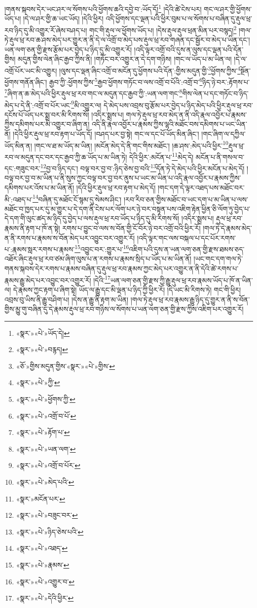 །གནས་སྐབས་དེར་ཡང་ཤར་ལ་སོགས་པའི་ཕྱོགས་ཆའི་དབྱེ་བ་:ཡོད་དོ།\footnote{«སྣར་»«པེ་»ཡོད་དེ།} །དེའི་ཚེ་ངེས་པར། གང་ལ་ཤར་གྱི་ཕྱོགས་ཡོད་པ། །དེ་ལ་ཤར་གྱི་ཆ་ཡང་ཡོད། །དེའི་ཕྱིར། འདི་ཕྱོགས་དང་ལྡན་པའི་ཕྱིར་བུམ་པ་ལ་སོགས་པ་བཞིན་དུ་རྡུལ་ཕྲ་རབ་ཉིད་དུ་མི་འགྱུར་རོ་ཞེས་བཤད་པ། གང་གི་རྡུལ་ལ་ཕྱོགས་ཡོད་པ། །དེས་རྡུལ་རྡུལ་ཕྲན་མིན་པར་བསྙད།\footnote{«སྣར་»«པེ་»བརྙད།} །གལ་ཏེ་རྡུལ་ཕྲ་རབ་ཆ་ཤས་མེད་པར་གྱུར་ན་ནི་དེ་ལ་འགྲོ་བ་མེད་པས་རྡུལ་ཕྲ་རབ་གཞན་དང་སྦྱོར་བ་མེད་པ་ཡིན་དང་། ཡན་ལག་ཅན་གྱི་རྫས་རྩོམ་པར་བྱེད་པ་ཉིད་དུ་མི་འགྱུར་རོ། །འདི་ལྟར་འགྲོ་བའི་དུས་ན་ལུས་དང་ལྡན་པའི་དོན་གྱིས། མདུན་གྱིས་ལེན་ཞིང་རྒྱབ་ཀྱིས་ནི། །གཏོང་བར་འགྱུར་ན་དེ་དག་གཉིས། །གང་ལ་ཡོད་པ་མ་ཡིན་ལ། །དེ་ལ་འགྲོ་པོར་ཡང་མི་འགྱུར། །ལུས་དང་ལྡན་ཞིང་འགྲོ་བ་མངོན་དུ་ཕྱོགས་པའི་དོན་:གྱིས་མདུན་གྱི་\footnote{«ཅོ་»གྱིས་མདུན་གྱིས་«སྣར་»«པེ་»གྱིས་}ཕྱོགས་ཀྱིས་\footnote{«སྣར་»«པེ་»ཀྱི་}སྔོན་ཕྱོགས་གནོན་ཞིང་། རྒྱབ་ཀྱི་:ཕྱོགས་ཀྱིས་\footnote{«སྣར་»«པེ་»ཕྱོགས་ཀྱི་}རྒྱབ་ཕྱོགས་གཏོང་བ་ལས་འགྲོ་བ་པོའི་:འགྲོ་བ་\footnote{«སྣར་»«པེ་»འགྲོ་བ་པོ་}ཉིད་ཉེ་བར་:རྟོགས་པ་\footnote{«སྣར་»«པེ་»རྟོག་པ་}ཞིག་ན་ཆ་མེད་པའི་ཕྱིར་རྡུལ་ཕྲ་རབ་གང་ལ་མདུན་དང་རྒྱབ་ཀྱི་:ཡན་ལག་གང་\footnote{«སྣར་»«པེ་»ཡན་ལག་}གིས་ལེན་པ་དང་གཏོང་བ་ཉིད་མེད་པ་དེ་ནི་:འགྲོ་བ་པོར་ཡང་\footnote{«སྣར་»«པེ་»འགྲོ་བ་པོར་}མི་འགྱུར་ལ། དེ་མེད་པས་འབྲས་བུ་རྩོམ་པར་བྱེད་པ་ཉིད་མེད་པའི་ཕྱིར་རྡུལ་ཕྲ་རབ་དངོས་པོ་ཡོད་པར་སྨྲ་བར་མི་རིགས་སོ། །འདིར་སྨྲས་པ། གལ་ཏེ་རྡུལ་ཕྲ་རབ་མེད་ན་ནི་འདི་རྣལ་འབྱོར་པ་རྣམས་ཀྱིས་དམིགས་པར་མི་འགྱུར་བ་ཞིག་ན། འདི་ནི་རྣལ་འབྱོར་པ་རྣམས་ཀྱིས་ལྷའི་མཐོང་བས་དམིགས་པ་ཡང་ཡིན་ནོ། །དེའི་ཕྱིར་རྡུལ་ཕྲ་རབ་རྟག་པ་ཡོད་དོ། །བཤད་པར་བྱ་སྟེ། གང་ལ་དང་པོ་ཡོད་མིན་ཞིང་། །གང་ཞིག་ལ་དཀྱིལ་ཡོད་མིན་ན། །གང་ལ་ཐ་མ་ཡོད་མ་ཡིན། །མངོན་མེད་དེ་ནི་གང་གིས་མཐོང་། །ཆ་ཤས་:མེད་པའི་ཕྱིར་\footnote{«སྣར་»«པེ་»མེད་པའི་}རྡུལ་ཕྲ་རབ་ལ་མདུན་དང་བར་དང་རྒྱབ་ཀྱི་ཆ་ཡོད་པ་མ་ཡིན་ཏེ། དེའི་ཕྱིར་:མངོན་པ་\footnote{«སྣར་»མངོན་པར་}མེད་དེ། མངོན་པ་ནི་གསལ་བ་དང་:གཟུང་བར་\footnote{«སྣར་»«པེ་»བཟུང་བར་}བྱ་བ་ཉིད་དང་། བལྟ་བར་བྱ་བ་:ཉིད་ཅེས་བྱ་བའི་\footnote{«སྣར་»«པེ་»ཉིད་ཅེས་པའི་}དོན་ཏེ་དེ་མེད་པའི་ཕྱིར་མངོན་པ་མེད་དོ། །བལྟ་བར་བྱ་བ་མ་ཡིན་པ་ནི་སུས་ཀྱང་བལྟ་བར་བྱ་བར་ནུས་པ་ཡང་མ་ཡིན་པ་འདི་རྣལ་འབྱོར་པ་རྣམས་ཀྱིས་དམིགས་པར་འོས་པ་མ་ཡིན་ནོ། །དེའི་ཕྱིར་རྡུལ་ཕྲ་རབ་རྟག་པ་མེད་དོ། །གང་དག་དེ་ལྟར་འཐད་པས་མཐོང་བར་མི་:འཐད་པ་\footnote{«སྣར་»«པེ་»འཐད་}བཞིན་དུ་མཐོང་ངོ་སྙམ་དུ་སེམས་ཤིང་། །རབ་རིབ་ཅན་གྱིས་མཐོང་བ་ཡང་དག་པ་མ་ཡིན་པ་ལས་མཐོང་བ་ཁྱད་པར་དུ་མ་གྱུར་པ་དེ་དག་ནི་ངེས་པར་ལོག་པར་ཉེ་བར་བསྟན་པས་འཇིག་རྟེན་ཕྱིན་ཅི་ལོག་ཏུ་བྱེད་པ་དེ་དག་གི་ལུང་ཚད་མ་ཉིད་དུ་བྱེད་པ་ལས་རྡུལ་ཕྲ་རབ་ཡོད་པ་ཉིད་དུ་མི་རིགས་སོ། །འདིར་སྨྲས་པ། རྡུལ་ཕྲ་རབ་རྣམས་ནི་རྟག་པ་ཁོ་ན་སྟེ། རགས་པ་བྱུང་བ་ལས་ས་བོན་གྱི་ངོ་བོར་ཉེ་བར་འགྲོ་བའི་ཕྱིར་རོ། །གལ་ཏེ་དེ་རྣམས་མེད་ན་ནི་རགས་པ་རྣམས་ས་བོན་མེད་པར་འབྱུང་བར་འགྱུར་རོ། །འདི་ལྟར་གང་ལས་བསྐལ་པ་དང་པོར་རགས་པ་:རྣམས་སླར་རགས་པ་རྣམས་\footnote{«སྣར་»«པེ་»རྣམས་}འབྱུང་བར་:གྱུར་པ་\footnote{«སྣར་»«པེ་»འགྱུར་བ་}འཇིག་པའི་དུས་ན་ཡན་ལག་ཅན་གྱི་རྫས་ཐམས་ཅད་འཐོར་ཞིང་རྡུལ་ཕྲ་རབ་ཙམ་ཞིག་ལུས་པ་ན་རགས་པ་རྣམས་སྲིད་པ་ཡོད་པ་མ་ཡིན་ནོ། །ཡང་གང་དག་གལ་ཏེ་གནས་སྐབས་དེར་རགས་པ་རྣམས་བཞིན་དུ་རྡུལ་ཕྲ་རབ་རྣམས་ཀྱང་མེད་པར་འགྱུར་ན་ནི་དེའི་ཚེ་རགས་པ་རྣམས་རྒྱུ་མེད་པར་འབྱུང་བར་འགྱུར་རོ། །དེའི་\footnote{«སྣར་»«པེ་»དེའི་ཕྱིར་}ཡན་ལག་ཅན་གྱི་རྫས་ཀྱི་རྒྱུ་རྡུལ་ཕྲ་རབ་རྣམས་ཡོད་པ་ཁོ་ན་ཡིན་ལ། དེ་རྣམས་ཀྱང་རྟག་པ་ཞིག་སྟེ། ཡོད་ལ་རྒྱུ་དང་མི་ལྡན་པ་ཉིད་ཀྱི་ཕྱིར་རོ། །དེ་ཡང་མི་རིགས་ཏེ། གང་གི་ཕྱིར། འབྲས་བུ་ཡིས་ནི་རྒྱུ་བཤིག་པ། །དེས་ན་རྒྱུ་ནི་རྟག་མ་ཡིན། །གལ་ཏེ་རྡུལ་ཕྲ་རབ་རྣམས་རྒྱུ་ཉིད་དུ་གྱུར་ན་ནི་ས་བོན་གྱིས་མྱུ་གུ་བཞིན་དུ་དེ་རྣམས་རྡུལ་ཕྲ་རབ་གཉིས་ལ་སོགས་པ་ཡན་ལག་ཅན་གྱི་རྫས་ཀྱིས་འཇིག་པར་འགྱུར་རོ། 